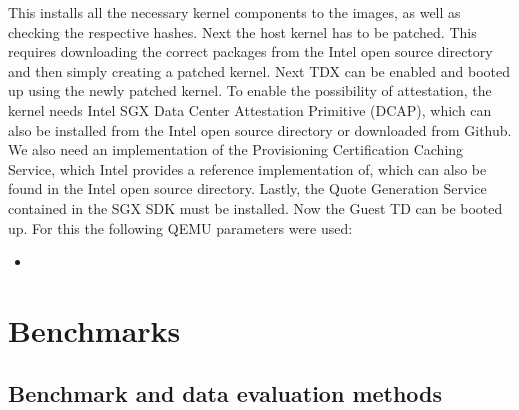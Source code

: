 \begin{table}
\centering
{}
\caption{Comparison of different timings of IPEX optimization method}
\label{tab:BOM}
\end{table}
This installs all the necessary kernel components to the images, as well as checking the respective hashes. Next the host kernel has to be patched. This requires downloading the correct packages from the Intel open source directory and then simply creating a patched kernel. Next TDX can be enabled and booted up using the newly patched kernel. To enable the possibility of attestation, the kernel needs Intel SGX Data Center Attestation Primitive (DCAP), which can also be installed from the Intel open source directory or downloaded from Github. We also need an implementation of the Provisioning Certification Caching Service, which Intel provides a reference implementation of, which can also be found in the Intel open source directory. Lastly, the Quote Generation Service contained in the SGX SDK must be installed. Now the Guest TD can be booted up. For this the following QEMU parameters were used:

\begin{itemize}
    \item {}
\end{itemize}

\section{Benchmarks}

\subsection{Benchmark and data evaluation methods}


